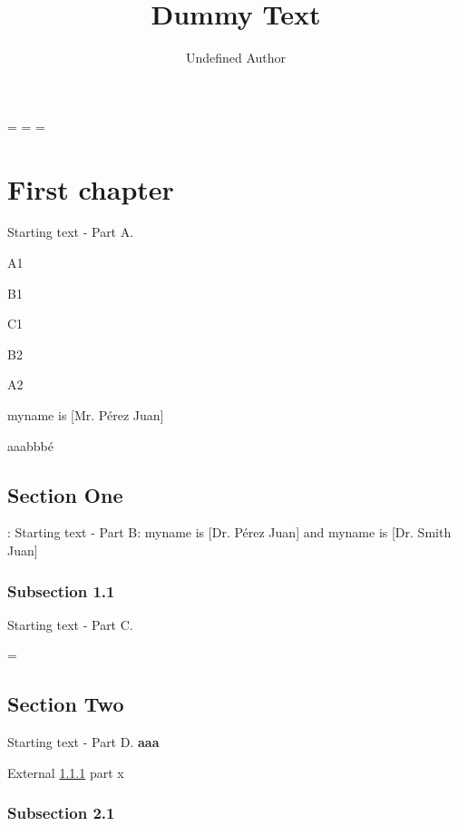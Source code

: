 \documentclass[12pt,twoside]{book}%
\title{Dummy Text}
\author{Undefined Author}
\date{}
\begin{document}
%

\maketitle{}%

%
\newdimen\originwordstretch%
\newdimen\originwordspace%
\originwordstretch=\font%
\originwordspace=\font%
\font=\originwordstretch%
\font=12pt%
\chapter{First chapter}%

Starting text - Part A.

	A1

		B1
%
{
\color[rgb]{0.914787503518,0.914787503518,0.755408574913}%

			C1

}
%

		B2

	A2

myname is [Mr. Pérez Juan]

aaabbbé

%
{
\centering%
\section{Section One}%

%
: Starting text - Part B: myname is [Dr. Pérez Juan] and myname is [Dr. Smith Juan]

%
\subsection{Subsection 1.1}%
\label{x}%

Starting text - Part C.

%
\font=\originwordstretch%
\font=10pt%

}
%
\section{Section Two}%

Starting text - Part D.
%
{
\bfseries{}%
\label{Inner example}aaa
}
%

External \ref{x}%
part\pageref{x}%
x

%
\subsection{Subsection 2.1}%
\end{document}

